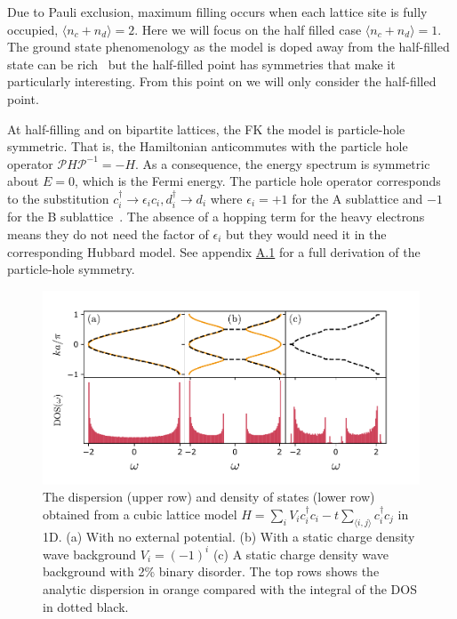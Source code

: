 Due to Pauli exclusion, maximum filling occurs when each lattice site is fully occupied, \(\langle n_c + n_d \rangle = 2\). Here we will focus on the half filled case \(\langle n_c + n_d \rangle = 1\). The ground state phenomenology as the model is doped away from the half-filled state can be rich~\autocite{jedrzejewskiFalicovKimballModels2001,gruberGroundStatesSpinless1990} but the half-filled point has symmetries that make it particularly interesting. From this point on we will only consider the half-filled point.

At half-filling and on bipartite lattices, the FK the model is particle-hole symmetric. That is, the Hamiltonian anticommutes with the particle hole operator \(\mathcal{P}H\mathcal{P}^{-1} = -H\). As a consequence, the energy spectrum is symmetric about \(E = 0\), which is the Fermi energy. The particle hole operator corresponds to the substitution \(c^\dagger_i \rightarrow \epsilon_i c_i, d^\dagger_i \rightarrow d_i\) where \(\epsilon_i = +1\) for the A sublattice and \(-1\) for the B sublattice~\autocite{gruberFalicovKimballModel2005}. The absence of a hopping term for the heavy electrons means they do not need the factor of \(\epsilon_i\) but they would need it in the corresponding Hubbard model. See appendix \protect\hyperlink{particle-hole-symmetry}{A.1} for a full derivation of the particle-hole symmetry.

\hypertarget{fig:simple_DOS}{%
\begin{figure}
\centering
\includegraphics[width=1\textwidth,height=\textheight]{figure_code/background_chapter/simple_DOS}
\caption[{Cubic Lattice dispersion with disorder}]{The dispersion (upper row) and density of states (lower row) obtained from a cubic lattice model \(H = \sum_{i} V_i c^\dagger_{i}c_{i} - t \sum_{\langle i,j\rangle} c^\dagger_{i}c_{j}\) in 1D. (a) With no external potential. (b) With a static charge density wave background \(V_i = (-1)^i\) (c) A static charge density wave background with 2\% binary disorder. The top rows shows the analytic dispersion in orange compared with the integral of the DOS in dotted black.}
\label{fig:simple_DOS}
\end{figure}
}


